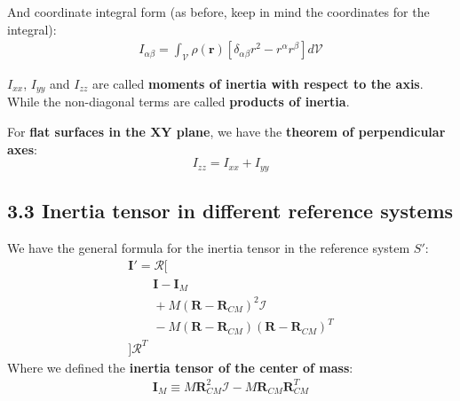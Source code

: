 \documentclass[a4paper,landscape,10pt]{cheatsheet}
\begin{document}
And coordinate integral form (as before, keep in mind the coordinates for the integral):
\begin{gather*}
I_{\alpha\beta} = \int_{\mathcal{V}}\rho(\textbf{r})[\delta_{\alpha\beta}r^2-r^\alpha r^\beta]d\mathcal{V}
\end{gather*}

$I_{xx}$, $I_{yy}$ and $I_{zz}$ are called \textbf{moments of inertia with respect to the axis}. While the non-diagonal
terms are called \textbf{products of inertia}.

For \textbf{flat surfaces in the XY plane}, we have the \textbf{theorem of perpendicular axes}:
$$
I_{zz} = I_{xx} + I_{yy}
$$



\subsection*{3.3 Inertia tensor in different reference systems}
We have the general formula for the inertia tensor in the reference system $S'$:
\begin{gather*}
  \textbf{I}' = \mathcal{R}[ \\
    \qquad \textbf{I} - \textbf{I}_M \\
    \qquad + M(\textbf{R}-\textbf{R}_{CM})^2\mathcal{I} \\
    \qquad - M(\textbf{R}-\textbf{R}_{CM})(\textbf{R}-\textbf{R}_{CM})^T \\
  ]\mathcal{R}^T
\end{gather*}
Where we defined the \textbf{inertia tensor of the center of mass}:
\begin{gather*}
  \textbf{I}_M \equiv M\textbf{R}_{CM}^2\mathcal{I} - M\textbf{R}_{CM}\textbf{R}_{CM}^T
\end{gather*}
\end{document}
